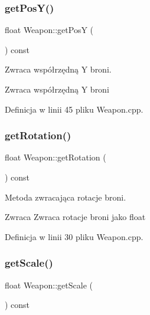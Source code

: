 \subsubsection{\texorpdfstring{get\+Pos\+Y()}{getPosY()}}
{\footnotesize\ttfamily float Weapon\+::get\+PosY (\begin{DoxyParamCaption}{ }\end{DoxyParamCaption}) const}



Zwraca współrzędną Y broni. 

\begin{DoxyReturn}{Zwraca}
współrzędną Y broni 
\end{DoxyReturn}


Definicja w linii 45 pliku Weapon.\+cpp.

\mbox{\label{class_weapon_af16afbd2da86bee0e48680e962abeca5}} 
\subsubsection{\texorpdfstring{get\+Rotation()}{getRotation()}}
{\footnotesize\ttfamily float Weapon\+::get\+Rotation (\begin{DoxyParamCaption}{ }\end{DoxyParamCaption}) const}



Metoda zwracająca rotacje broni. 

\begin{DoxyReturn}{Zwraca}
Zwraca rotacje broni jako float 
\end{DoxyReturn}


Definicja w linii 30 pliku Weapon.\+cpp.

\mbox{\label{class_weapon_ac7ab3d1fc902d0a063d5c447ebda674b}} 
\subsubsection{\texorpdfstring{get\+Scale()}{getScale()}}
{\footnotesize\ttfamily float Weapon\+::get\+Scale (\begin{DoxyParamCaption}{ }\end{DoxyParamCaption}) const}



